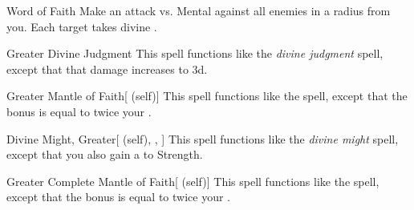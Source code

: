\lowercase{\hypertarget{spell:Word of Faith}{}}\label{spell:Word of Faith}
\begin{freeability}[\nth{3}]{\hypertarget{spell:Word of Faith}{Word of Faith}}
Make an attack vs. Mental against all enemies in a \areamed radius from you.
\hit Each target takes divine .
\end{freeability}
\vspace{0.25em}



\lowercase{\hypertarget{spell:Greater Divine Judgment}{}}\label{spell:Greater Divine Judgment}
\begin{freeability}[\nth{4}]{\hypertarget{spell:Greater Divine Judgment}{Greater Divine Judgment}}
This spell functions like the \textit{divine judgment} spell, except that that damage increases to  \plus3d.
\end{freeability}
\vspace{0.25em}



\lowercase{\hypertarget{spell:Greater Mantle of Faith}{}}\label{spell:Greater Mantle of Faith}
\begin{attuneability}[\nth{4}]{\hypertarget{spell:Greater Mantle of Faith}{Greater Mantle of Faith}}[ (self)]
This spell functions like the  spell, except that the bonus is equal to twice your .
\end{attuneability}
\vspace{0.25em}



\lowercase{\hypertarget{spell:Divine Might, Greater}{}}\label{spell:Divine Might, Greater}
\begin{attuneability}[\nth{5}]{\hypertarget{spell:Divine Might, Greater}{Divine Might, Greater}}[ (self), , ]
This spell functions like the \textit{divine might} spell, except that you also gain a   to Strength.
\end{attuneability}
\vspace{0.25em}



\lowercase{\hypertarget{spell:Greater Complete Mantle of Faith}{}}\label{spell:Greater Complete Mantle of Faith}
\begin{attuneability}[\nth{5}]{\hypertarget{spell:Greater Complete Mantle of Faith}{Greater Complete Mantle of Faith}}[ (self)]
This spell functions like the  spell, except that the bonus is equal to twice your .
\end{attuneability}
\vspace{0.25em}



